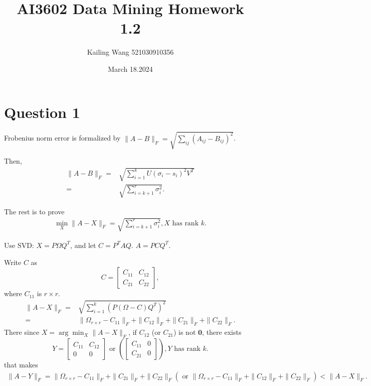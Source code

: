 \documentclass{article}
\begin{document}
	\title{AI3602 Data Mining Homework 1.2}
	\author{Kailing Wang 521030910356}
	\date{March 18.2024}
	\maketitle

	\section*{Question 1}
	Frobenius norm error is formalized by $\|A-B\|_F = \sqrt{\sum_{ij}(A_{ij}-B_{ij})^2}$.
	
	Then, 
	\begin{align*}
		\|A-B\|_F = &\sqrt{\sum_{i=1}^k U(\sigma_{i}-s_{i})^2 V^T} \\
	  = & \sqrt{\sum_{i=k+1}^r \sigma_i^2}.
	\end{align*}
	
	The rest is to prove 
	\begin{align}
		\min_X \|A-X\|_F = \sqrt{\sum_{i=k+1}^r \sigma_i^2}, X \text{ has rank } k.
	\end{align}
	
	Use SVD: $X = P\Omega Q^T$, and let $C = P^T A Q$. $A = P C Q^T$.
	
	Write $C$ as 
	\[
	C = \begin{bmatrix}
		C_{11} & C_{12} \\
		C_{21} & C_{22}
	\end{bmatrix},
	\]	
	where $C_{11}$ is $r\times r$. 
	\begin{align*}
		\|A-X\|_F = & \sqrt{\sum_{i=1}^k (P (\Omega-C) Q^T)^2} \\
		= & \|\Omega_{r\times r}-C_{11}\|_F + \|C_{12}\|_F + \|C_{21}\|_F + \|C_{22}\|_F.
	\end{align*}
	There since $X=\arg\min_X \|A-X\|_F$, if $C_{12}$ (or $C_{21}$) is not $\mathbf 0$, there exists
	\[
	Y = \begin{bmatrix}
		C_{11} & C_{12} \\
	 	0 & 0
	\end{bmatrix} \text{ or }\left(
	\begin{bmatrix}
		C_{11} & 0 \\
		C_{21} & 0
	\end{bmatrix}\right),Y\text{ has rank }k.
	\]
	that makes 
	\begin{align*}
		\|A-Y\|_F = \|\Omega_{r\times r}-C_{11}\|_F + \|C_{21}\|_F + \|C_{22}\|_F (\text{ or }\|\Omega_{r\times r}-C_{11}\|_F + 	\|C_{12}\|_F + \|C_{22}\|_F) < \|A-X\|_F.
	\end{align*}
	
\end{document}
